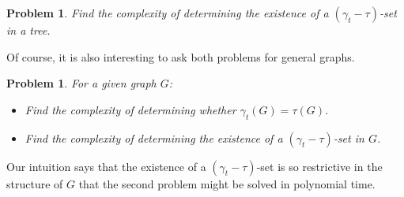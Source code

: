 \documentclass[12pt]{article}%
\newtheorem{problem}[theorem]{Problem}
\theoremstyle{definition}
\newcommand{\gtt}{$(\gamma_t - \tau)$}
\begin{document}
\begin{problem}
Find the complexity of determining the existence of a
\gtt-set in a tree.
\end{problem}

Of course, it is also interesting to ask both problems for general
graphs.

\begin{problem}
For a given graph $G$:
\begin{itemize}
	\item Find the complexity of determining whether $\gamma_t (G)
		= \tau (G)$.
	\item Find the complexity of determining the existence of a \gtt-set
		in $G$.
\end{itemize}
\end{problem}

Our intuition says that the existence of a \gtt-set is so restrictive in
the structure of $G$ that the second problem might be solved in
polynomial time.


{}

\end{document}
